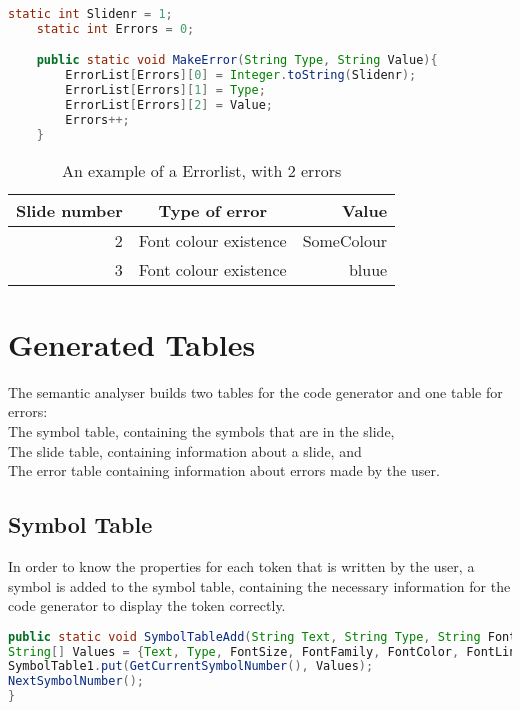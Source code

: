 \begin{lstlisting}[frame=single,caption= Function: MakeError, label=LSTMakeError, language=java]
	static int Slidenr = 1;
	static int Errors = 0;

	public static void MakeError(String Type, String Value){
		ErrorList[Errors][0] = Integer.toString(Slidenr);
		ErrorList[Errors][1] = Type;
		ErrorList[Errors][2] = Value;
		Errors++;
	}
\end{lstlisting}

\begin{table}
	\centering
		\begin{tabular}{| r| c | r |}
		\hline
Slide number & Type of error & Value \\
\hline
2 & Font colour existence & SomeColour \\
3 & Font colour existence & bluue \\
\hline
		\end{tabular}
		\caption{An example of a Errorlist, with 2 errors}
		\label{TLBErrorlist}
\end{table}

\section{Generated Tables}
The semantic analyser builds two tables for the code generator and one table for errors: \\
The symbol table, containing the symbols that are in the slide, \\
The slide table, containing information about a slide, and \\
The error table containing information about errors made by the user.

\subsection{Symbol Table}
In order to know the properties for each token that is written by the user, a symbol is added to the symbol table, containing the necessary information for the code generator to display the token correctly.

\begin{lstlisting}[frame=single,caption=Function: SymbolTableAdd, label=LSTSemanticSymbolTableAdd, language = java]
public static void SymbolTableAdd(String Text, String Type, String FontSize, String FontFamily,String FontColor, String FontLineheight, String FontWeight, String Link){
String[] Values = {Text, Type, FontSize, FontFamily, FontColor, FontLineheight, FontWeight, Link};
SymbolTable1.put(GetCurrentSymbolNumber(), Values);
NextSymbolNumber();
}
\end{lstlisting}

